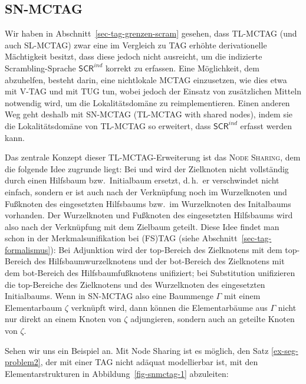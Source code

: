 \subsection{SN-MCTAG}\label{sec-snmctag}

Wir haben in Abschnitt~\ref{sec-tag-grenzen-scram} gesehen, dass TL-MCTAG (und auch SL-MCTAG) zwar eine im Vergleich zu TAG erhöhte derivationelle Mächtigkeit besitzt, dass diese jedoch nicht ausreicht, um die indizierte Scrambling-Sprache  $\mathsf{SCR}^{ind}$ korrekt zu erfassen. Eine Möglichkeit, dem abzuhelfen, besteht darin, eine nichtlokale MCTAG einzusetzen, wie dies etwa \cite{Rambow:94} mit V-TAG und \cite{Gerdes:04} mit TUG tun, wobei jedoch der Einsatz von zusätzlichen Mitteln notwendig wird, um die Lokalitätsdomäne zu reimplementieren. Einen anderen Weg geht deshalb \cite{Kallmeyer:05} mit SN-MCTAG (TL-MCTAG with shared nodes), indem sie die Lokalitätsdomäne von TL-MCTAG so erweitert, dass $\mathsf{SCR}^{ind}$ erfasst werden kann. 

Das zentrale Konzept dieser TL-MCTAG-Erweiterung ist das \textsc{Node Sharing}, dem die folgende Idee zugrunde liegt: Bei  und  wird der Zielknoten nicht vollständig durch einen Hilfsbaum bzw.\ Initialbaum ersetzt, d.\,h.\ er verschwindet nicht einfach, sondern er ist auch nach der Verknüpfung noch im Wurzelknoten und Fu\ss knoten des eingesetzten Hilfsbaums bzw.\ im Wurzelknoten des Initalbaums vorhanden. Der Wurzelknoten und Fu\ss knoten des eingesetzten Hilfsbaums wird also nach der Verknüpfung mit dem Zielbaum geteilt. Diese Idee findet man schon in der Merkmalsunifikation bei (FS)TAG (siehe Abschnitt~\ref{sec-tag-formalismus}): Bei Adjunktion wird der {\sc top}-Bereich des Zielknotens mit dem {\sc top}-Bereich des Hilfsbaumwurzelknotens und der {\sc bot}-Bereich des Zielknotens mit dem {\sc bot}-Bereich des Hilfsbaumfu\ss knotens unifiziert; bei Substitution unifizieren die {\sc top}-Bereiche des Zielknotens und des Wurzelknoten des eingesetzten Initialbaums. Wenn in SN-MCTAG also eine Baummenge $\Gamma$ mit einem Elementarbaum $\zeta$ verknüpft wird, dann können die Elementarbäume aus $\Gamma$ nicht nur direkt an einem Knoten von $\zeta$ adjungieren, sondern auch an geteilte Knoten von $\zeta$.

Sehen wir uns ein Beispiel an. Mit Node Sharing ist es möglich, den Satz \ref{ex-seg-problem2}, der mit einer TAG nicht adäquat modellierbar ist, mit den Elementarstrukturen in Abbildung~\ref{fig-snmctag-1} abzuleiten: 

